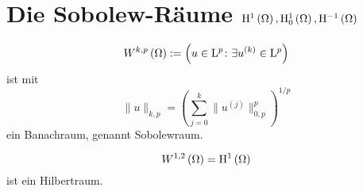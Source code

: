 \section{Die Sobolew-Räume $\mathrm{H}^{1}\left(\Omega\right), \mathrm{H}^{1}_{0}\left(\Omega\right), \mathrm{H}^{-1}\left(\Omega\right)$}
\begin{definition}
	\begin{equation*}
		W^{k,p}\left(\Omega\right):=\left(u\in\mathrm{L}^{p}\colon\exists u^{\left(k\right)}\in\mathrm{L}^{p}\right)
	\end{equation*}
	ist mit
	\begin{equation*}
		\|u\|_{k,p} = \left(\sum_{j=0}^{k}\|u^{\left(j\right)}\|_{0,p}^{p}\right)^{1/p}
	\end{equation*}
	ein Banachraum, genannt Sobolewraum.
\end{definition}
\begin{definition}
	\begin{equation*}
		W^{1,2}\left(\Omega\right) = \mathrm{H}^{1}\left(\Omega\right)
	\end{equation*}
	ist ein Hilbertraum.
\end{definition}


